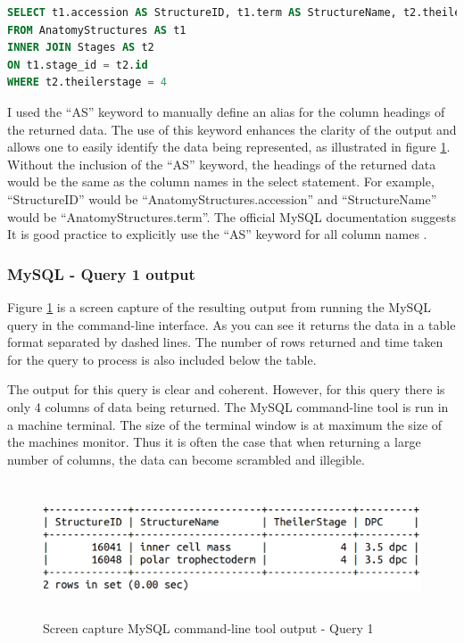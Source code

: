\begin{lstlisting}[language=SQL, caption=MySQL query 1 statement. All structures at Theiler Stage X., label=code:mysqlquery1]
SELECT t1.accession AS StructureID, t1.term AS StructureName, t2.theilerstage AS TheilerStage, t2.dpc AS DPC
FROM AnatomyStructures AS t1
INNER JOIN Stages AS t2
ON t1.stage_id = t2.id
WHERE t2.theilerstage = 4
\end{lstlisting}

I used the ``AS'' keyword to manually define an alias for the column headings of the returned data. The use of this keyword enhances the clarity of the output and allows one to easily identify the data being represented, as illustrated in figure \ref{fig:mysqlquery1}. Without the inclusion of the ``AS'' keyword, the headings of the returned data would be the same as the column names in the select statement. For example, ``StructureID'' would be ``AnatomyStructures.accession'' and ``StructureName'' would be ``AnatomyStructures.term''. The official MySQL documentation suggests It is good practice to explicitly use the ``AS'' keyword for all column names \cite{mysqlworkbench}.

\subsubsection*{MySQL - Query 1 output}\label{mysqlquery1output}
Figure \ref{fig:mysqlquery1} is a screen capture of the resulting output from running the MySQL query in the command-line interface. As you can see it returns the data in a table format separated by dashed lines. The number of rows returned and time taken for the query to process is also included below the table.

The output for this query is clear and coherent. However, for this query there is only 4 columns of data being returned. The MySQL command-line tool is run in a machine terminal. The size of the terminal window is at maximum the size of the machines monitor. Thus it is often the case that when returning a large number of columns, the data can become scrambled and illegible.

\begin{figure}[H]\begin{center}\includegraphics[height=4cm,width=0.9\linewidth]{images/mysqlquery1}\caption{Screen capture MySQL command-line tool output - Query 1}\label{fig:mysqlquery1}\end{center}\end{figure}

